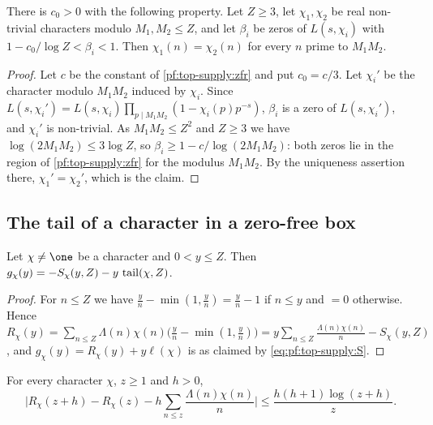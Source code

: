 \begin{lemma}\label{pf:top-supply:page}
There is $c_0>0$ with the following property. Let $Z\ge3$, let $\chi_1,\chi_2$ be real non-trivial characters
modulo $M_1,M_2\le Z$, and let $\beta_i$ be zeros of $L(s,\chi_i)$ with $1-c_0/\log Z<\beta_i<1$. Then
$\chi_1(n)=\chi_2(n)$ for every $n$ prime to $M_1M_2$.
\end{lemma}

\begin{proof}
Let $c$ be the constant of \cref{pf:top-supply:zfr} and put $c_0=c/3$. Let $\chi_i'$ be the character modulo
$M_1M_2$ induced by $\chi_i$. Since $L(s,\chi_i')=L(s,\chi_i)\prod_{p\mid M_1M_2}(1-\chi_i(p)p^{-s})$, $\beta_i$ is a
zero of $L(s,\chi_i')$, and $\chi_i'$ is non-trivial. As $M_1M_2\le Z^2$ and $Z\ge3$ we have
$\log(2M_1M_2)\le3\log Z$, so $\beta_i\ge1-c/\log(2M_1M_2)$: both zeros lie in the region of
\cref{pf:top-supply:zfr} for the modulus $M_1M_2$. By the uniqueness assertion there, $\chi_1'=\chi_2'$, which is
the claim.
\end{proof}

\subsection{The tail of a character in a zero-free box}\label{sec:pf:top-supply:tail}

\begin{lemma}[Splitting]\label{pf:top-supply:split}
Let $\chi\ne\one$ be a character and $0<y\le Z$. Then $g_\chi(y)=-S_\chi(y,Z)-y\,\operatorname{tail}(\chi,Z)$.
\end{lemma}

\begin{proof}
For $n\le Z$ we have $\frac yn-\min(1,\frac yn)=\frac yn-1$ if $n\le y$ and $=0$ otherwise. Hence
$R_\chi(y)=\sum_{n\le Z}\Lambda(n)\chi(n)\big(\frac yn-\min(1,\frac yn)\big)=y\sum_{n\le Z}\frac{\Lambda(n)\chi(n)}n-S_\chi(y,Z)$,
and $g_\chi(y)=R_\chi(y)+y\ell(\chi)$ is as claimed by \eqref{eq:pf:top-supply:S}.
\end{proof}

\begin{lemma}\label{pf:top-supply:taildiff}
For every character $\chi$, $z\ge1$ and $h>0$,
\[
\Big|R_\chi(z+h)-R_\chi(z)-h\sum_{n\le z}\frac{\Lambda(n)\chi(n)}n\Big|\le\frac{h(h+1)\log(z+h)}z.
\]
\end{lemma}

